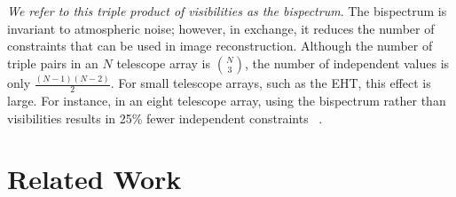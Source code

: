 {{\it We refer to this triple product of visibilities as the bispectrum}. The bispectrum is invariant to atmospheric noise; however, in exchange, it reduces the number of constraints that can be used in image reconstruction. Although the number of triple pairs in an $N$ telescope array is ${N\choose 3}$, the number of independent values is only $\frac{(N-1)(N-2)}{2}$.
For small telescope arrays, such as the EHT, this effect is large. 
For instance, in an eight telescope array, using the bispectrum rather than visibilities results in 25\% fewer independent 
constraints 
~\cite{felli1989very}.




 
\vspace{-.05in}
\section{Related Work}
\label{sec:related}
\vspace{-.05in}


 


}

